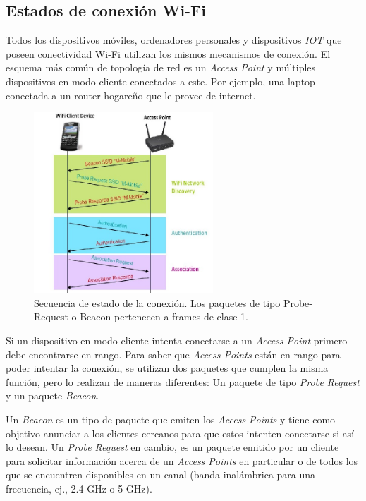 \subsection{Estados de conexión Wi-Fi}

Todos los dispositivos móviles, ordenadores personales y dispositivos \emph{IOT} que poseen conectividad Wi-Fi utilizan los mismos mecanismos de conexión. El esquema más común de topología de red es un \emph{Access Point} y múltiples dispositivos en modo cliente conectados a este. Por ejemplo, una laptop conectada a un router hogareño que le provee de internet.

\begin{figure}[!htb]
	\centering
	\includegraphics[width=0.6\textwidth]{Figuras/fig1.jpg}
	\captionsetup{margin=2cm}
	\caption[Secuencia de estado de la conexión]{Secuencia de estado de la conexión. Los paquetes de tipo Probe-Request o Beacon pertenecen a frames de clase 1. }
	\label{fig:frame-type}
\end{figure}

Si un dispositivo en modo cliente intenta conectarse a un \emph{Access Point} primero debe encontrarse en rango. Para saber que \emph{Access Points} están en rango para poder intentar la conexión, se utilizan dos paquetes que cumplen la misma función, pero lo realizan de maneras diferentes: Un paquete de tipo \emph{Probe Request} y un paquete \emph{Beacon}.

Un \emph{Beacon} es un tipo de paquete que emiten los \emph{Access Points} y tiene como objetivo anunciar a los clientes cercanos para que estos intenten conectarse si así lo desean. Un \emph{Probe Request} en cambio, es un paquete emitido por un cliente para solicitar información acerca de un \emph{Access Points} en particular o de todos los que se encuentren disponibles en un canal (banda inalámbrica para una frecuencia, ej., 2.4 GHz o 5 GHz).

